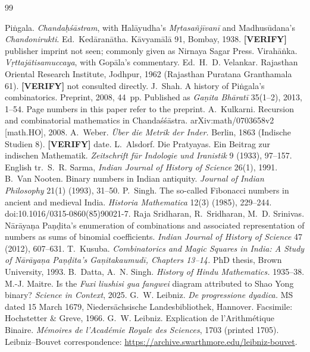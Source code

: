 \documentclass[11pt,letterpaper]{article}
\newcommand{\tagbox}[2]{\textsf{\textbf{\color{#1}#2}}}
\newcommand{\VERIFY}{\tagbox{tagverify}{[VERIFY]}}
\theoremstyle{plain}
\theoremstyle{remark}
\begin{document}
\begin{thebibliography}{99}\small
\setlength{\itemsep}{2pt}

 Piṅgala. \emph{Chandaḥśāstram}, with Halāyudha's \emph{Mṛtasañjīvanī} and Madhusūdana's \emph{Chandonirukti}. Ed.\ Kedāranātha. Kāvyamālā 91, Bombay, 1938. \VERIFY{} publisher imprint not seen; commonly given as Nirnaya Sagar Press.
 Virahāṅka. \emph{Vṛttajātisamuccaya}, with Gopāla's commentary. Ed.\ H.~D. Velankar. Rajasthan Oriental Research Institute, Jodhpur, 1962 (Rajasthan Puratana Granthamala 61). \VERIFY{} not consulted directly.
 J.~Shah. A history of Piṅgala's combinatorics. Preprint, 2008, 44~pp. Published as \emph{Gaṇita Bhāratī} 35(1--2), 2013, 1--54. Page numbers in this paper refer to the preprint.
 A.~Kulkarni. Recursion and combinatorial mathematics in Chandaśśāstra. arXiv:math/0703658v2 [math.HO], 2008.
 A.~Weber. \emph{Über die Metrik der Inder.} Berlin, 1863 (Indische Studien 8). \VERIFY{} date.
 L.~Alsdorf. Die Pratyayas. Ein Beitrag zur indischen Mathematik. \emph{Zeitschrift für Indologie und Iranistik} 9 (1933), 97--157. English tr.\ S.~R. Sarma, \emph{Indian Journal of History of Science} 26(1), 1991.
 B.~Van Nooten. Binary numbers in Indian antiquity. \emph{Journal of Indian Philosophy} 21(1) (1993), 31--50.
 P.~Singh. The so-called Fibonacci numbers in ancient and medieval India. \emph{Historia Mathematica} 12(3) (1985), 229--244. doi:10.1016/0315-0860(85)90021-7.
 Raja Sridharan, R.~Sridharan, M.~D. Srinivas. Nārāyaṇa Paṇḍita's enumeration of combinations and associated representation of numbers as sums of binomial coefficients. \emph{Indian Journal of History of Science} 47 (2012), 607--631.
 T.~Kusuba. \emph{Combinatorics and Magic Squares in India: A Study of Nārāyaṇa Paṇḍita's Gaṇitakaumudī, Chapters 13--14.} PhD thesis, Brown University, 1993.
 B.~Datta, A.~N. Singh. \emph{History of Hindu Mathematics.} 1935--38.
 M.-J. Maitre. Is the \emph{Fuxi liushisi gua fangwei} diagram attributed to Shao Yong binary? \emph{Science in Context}, 2025.
 G.~W. Leibniz. \emph{De progressione dyadica.} MS dated 15 March 1679, Niedersächsische Landesbibliothek, Hannover. Facsimile: Hochstetter \& Greve, 1966.
 G.~W. Leibniz. Explication de l'Arithmétique Binaire. \emph{Mémoires de l'Académie Royale des Sciences}, 1703 (printed 1705). Leibniz--Bouvet correspondence: \url{https://archive.swarthmore.edu/leibniz-bouvet}.

\end{thebibliography}
\end{document}
